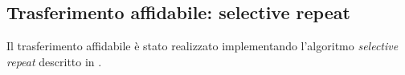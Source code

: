 \subsection{Trasferimento affidabile: selective repeat}
%
Il trasferimento affidabile è stato realizzato implementando l'algoritmo 
\emph{selective repeat} descritto in \cite{kurose}.
%


